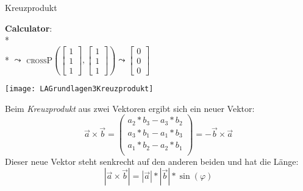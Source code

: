 \begin{bla}{Kreuzprodukt}
   \begin{marginfigure}[5em]
    \begin{tcolorbox}[colback=white!95!black,colframe=white!75!black,title=CAS:,arc=0mm]
      \begin{scriptsize}
        \textbf{Calculator}: \\*
         \\*
        \( \leadsto \) \textsc{crossP}\( \left( \left[ \begin{smallmatrix}
          1 \\ 1 \\ 1
        \end{smallmatrix} \right], \left[ \begin{smallmatrix}
          1 \\ 1 \\ 1
        \end{smallmatrix} \right] \right) \leadsto \left[ \begin{smallmatrix}
          0 \\ 0 \\ 0
        \end{smallmatrix} \right] \)
      \end{scriptsize}
    \end{tcolorbox}
  \end{marginfigure}
  \begin{marginfigure}[0em]
    \texttt{[image: LAGrundlagen3Kreuzprodukt]}
    \caption{Kreuzprodukt}
  \end{marginfigure}
Beim \emph{Kreuzprodukt} aus zwei Vektoren ergibt sich ein neuer Vektor:
  \begin{equation*}
      \vec{a} \times \vec{b} =
      \begin{pmatrix}
      a_2 * b_3 - a_3 * b_2 \\
      a_3 * b_1 - a_1 * b_3 \\
      a_1 * b_2 - a_2 * b_1 \\
    \end{pmatrix}
    = - \vec{b} \times \vec{a}
  \end{equation*}
  Dieser neue Vektor steht senkrecht auf den anderen beiden und hat die Länge:
  \begin{equation*}
    |\vec{a} \times \vec{b}| = |\vec{a}| * |\vec{b}| * \sin(\varphi)
  \end{equation*}
\end{bla}

